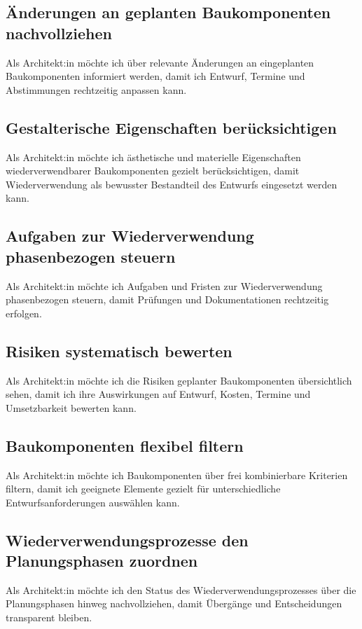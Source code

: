 \subsection{Änderungen an geplanten Baukomponenten nachvollziehen}
\label{us:a-07} Als Architekt:in möchte ich über relevante Änderungen an eingeplanten Baukomponenten informiert werden, damit ich Entwurf, Termine und Abstimmungen rechtzeitig anpassen kann.

\subsection{Gestalterische Eigenschaften berücksichtigen}
\label{us:a-08} Als Architekt:in möchte ich ästhetische und materielle Eigenschaften wiederverwendbarer Baukomponenten gezielt berücksichtigen, damit Wiederverwendung als bewusster Bestandteil des Entwurfs eingesetzt werden kann.

\subsection{Aufgaben zur Wiederverwendung phasenbezogen steuern}
\label{us:a-09} Als Architekt:in möchte ich Aufgaben und Fristen zur Wiederverwendung phasenbezogen steuern, damit Prüfungen und Dokumentationen rechtzeitig erfolgen.

\subsection{Risiken systematisch bewerten}
\label{us:a-10} Als Architekt:in möchte ich die Risiken geplanter Baukomponenten übersichtlich sehen, damit ich ihre Auswirkungen auf Entwurf, Kosten, Termine und Umsetzbarkeit bewerten kann.

\subsection{Baukomponenten flexibel filtern}
\label{us:a-11} Als Architekt:in möchte ich Baukomponenten über frei kombinierbare Kriterien filtern, damit ich geeignete Elemente gezielt für unterschiedliche Entwurfsanforderungen auswählen kann.

\subsection{Wiederverwendungsprozesse den Planungsphasen zuordnen}
\label{us:a-12} Als Architekt:in möchte ich den Status des Wiederverwendungsprozesses über die Planungsphasen hinweg nachvollziehen, damit Übergänge und Entscheidungen transparent bleiben.

